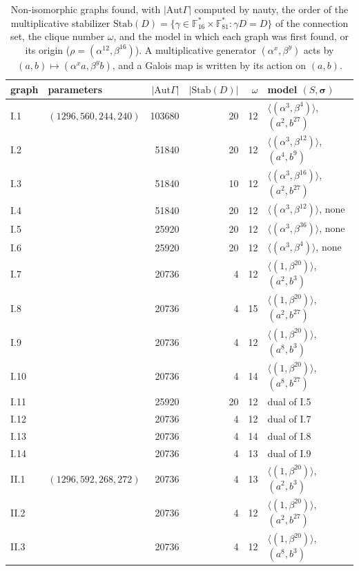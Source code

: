 \documentclass[11pt]{amsart}
\theoremstyle{definition}
\newcommand{\F}{\mathbb{F}}
\newcommand{\Aut}{\mathrm{Aut}}
\begin{document}
\begin{table}[t]
\centering\small
\caption{Non-isomorphic graphs found, with $|\Aut\Gamma|$ computed by nauty, the order of the multiplicative stabilizer $\mathrm{Stab}(D)=\{\gamma\in\F_{16}^*\times\F_{81}^*:\gamma D=D\}$ of the connection set, the clique number $\omega$, and the model in which each graph was first found, or its origin ($\rho=(\alpha^{12},\beta^{16})$). A multiplicative generator $(\alpha^x,\beta^y)$ acts by $(a,b)\mapsto(\alpha^xa,\beta^yb)$, and a Galois map is written by its action on $(a,b)$.}\label{tab:classes}
\begin{tabular}{llrrrl}
\toprule
graph & parameters & $|\Aut\Gamma|$ & $|\mathrm{Stab}(D)|$ & $\omega$ & model $(S,\boldsymbol\sigma)$\\
\midrule
I.1 & $(1296,560,244,240)$ & 103680 & 20 & 12 & $\langle(\alpha^3,\beta^4)\rangle$, $(a^2,b^{27})$ \\
I.2 & & 51840 & 20 & 12 & $\langle(\alpha^3,\beta^{12})\rangle$, $(a^4,b^{9})$ \\
I.3 & & 51840 & 10 & 12 & $\langle(\alpha^3,\beta^{16})\rangle$, $(a^2,b^{27})$ \\
I.4 & & 51840 & 20 & 12 & $\langle(\alpha^3,\beta^{12})\rangle$, none \\
I.5 & & 25920 & 20 & 12 & $\langle(\alpha^3,\beta^{36})\rangle$, none \\
I.6 & & 25920 & 20 & 12 & $\langle(\alpha^3,\beta^{4})\rangle$, none \\
I.7 & & 20736 & 4 & 12 & $\langle(1,\beta^{20})\rangle$, $(a^2,b^{3})$ \\
I.8 & & 20736 & 4 & 15 & $\langle(1,\beta^{20})\rangle$, $(a^2,b^{27})$ \\
I.9 & & 20736 & 4 & 12 & $\langle(1,\beta^{20})\rangle$, $(a^8,b^{3})$ \\
I.10 & & 20736 & 4 & 14 & $\langle(1,\beta^{20})\rangle$, $(a^8,b^{27})$ \\
I.11 & & 25920 & 20 & 12 & dual of I.5 \\
I.12 & & 20736 & 4 & 12 & dual of I.7 \\
I.13 & & 20736 & 4 & 14 & dual of I.8 \\
I.14 & & 20736 & 4 & 13 & dual of I.9 \\
\midrule
II.1 & $(1296,592,268,272)$ & 20736 & 4 & 13 & $\langle(1,\beta^{20})\rangle$, $(a^2,b^{3})$ \\
II.2 & & 20736 & 4 & 12 & $\langle(1,\beta^{20})\rangle$, $(a^2,b^{27})$ \\
II.3 & & 20736 & 4 & 12 & $\langle(1,\beta^{20})\rangle$, $(a^8,b^{3})$ \\

\end{tabular}
\end{table}
\end{document}
